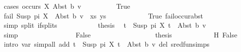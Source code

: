 \begin{isabellebody}
\ {\isacharparenleft}{\kern0pt}cases\ {\isachardoublequoteopen}occurs\ X\ {\isacharparenleft}{\kern0pt}Abst\ b\ v{\isacharparenright}{\kern0pt}{\isachardoublequoteclose}{\isacharparenright}{\kern0pt}\isanewline
\ \ \ \ \ \ \ \ \isamarkupfalse%
\ True\isanewline
\ \ \ \ \ \ \ \ %
\isanewline
\ \ \ \ \ \ \ \ \isamarkupfalse%
\ {\isachardoublequoteopen}fail\ {\isacharparenleft}{\kern0pt}{\isacharparenleft}{\kern0pt}Susp\ pi\ X\ {\isasymapprox}{\isacharquery}{\kern0pt}\ Abst\ b\ v{\isacharparenright}{\kern0pt}\ {\isacharhash}{\kern0pt}\ xs{\isacharcomma}{\kern0pt}\ ys{\isacharparenright}{\kern0pt}{\isachardoublequoteclose}\isanewline
\ \ \ \ \ \ \ \ \ \ \isamarkupfalse%
\ True\ fail{\isacharunderscore}{\kern0pt}occur{\isacharunderscore}{\kern0pt}abst\ \isamarkupfalse%
\ {\isacharparenleft}{\kern0pt}simp\ split{\isacharcolon}{\kern0pt}\ if{\isacharunderscore}{\kern0pt}splits{\isacharparenright}{\kern0pt}\isanewline
\ \ \ \ \ \ \ \ \isamarkupfalse%
\ \isamarkupfalse%
\ {\isacharquery}{\kern0pt}thesis\ \isamarkupfalse%
\ {\isacartoucheopen}t{}\ {\isacharequal}{\kern0pt}\ Susp\ pi\ X{\isacartoucheclose}\ {\isacartoucheopen}t{}\ {\isacharequal}{\kern0pt}\ Abst\ b\ v{\isacartoucheclose}\isanewline
\ \ \ \ \ \ \ \ \ \ \isamarkupfalse%
\ simp\isanewline
\ \ \ \ \ \ \isamarkupfalse%
\isanewline
\ \ \ \ \ \ \ \ \isamarkupfalse%
\ False\isanewline
\ \ \ \ \ \ \ \ %
\isanewline
\ \ \ \ \ \ \ \ \isamarkupfalse%
\ {\isacharquery}{\kern0pt}thesis\isanewline
\ \ \ \ \ \ \ \ \ \ \isamarkupfalse%
\ H\ False\ \isamarkupfalse%
\ {\isacharparenleft}{\kern0pt}intro\ var{\isacharunderscore}{\kern0pt}{}{\isacharparenright}{\kern0pt}\ {\isacharparenleft}{\kern0pt}simp{\isacharunderscore}{\kern0pt}all\ add{\isacharcolon}{\kern0pt}\ {\isacartoucheopen}t{}\ {\isacharequal}{\kern0pt}\ Susp\ pi\ X{\isacartoucheclose}\ {\isacartoucheopen}t{}\ {\isacharequal}{\kern0pt}\ Abst\ b\ v{\isacartoucheclose}\ del{\isacharcolon}{\kern0pt}\ sred{\isacharunderscore}{\kern0pt}fun{\isachardot}{\kern0pt}simps{\isacharparenright}{\kern0pt}\isanewline
\ \ \ \ \ \ \isamarkupfalse%
\isanewline

\end{isabellebody}
